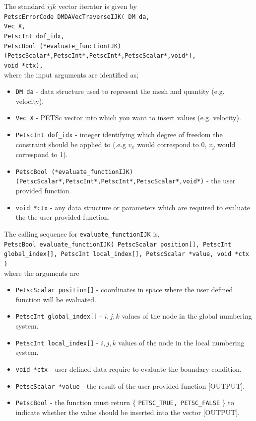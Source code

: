 \documentclass[paper=a4, fontsize=11pt,twoside]{scrartcl}
\newcommand{\shellcmd}[1]{\\\indent\indent\texttt{\hspace{5mm}\footnotesize #1}\\}
\newcommand{\unix}[1]{\texttt{\footnotesize #1}}
\begin{document}
{{The standard $ijk$ vector iterator is given by
\shellcmd{PetscErrorCode DMDAVecTraverseIJK( \newline
  DM da, \\
  Vec X, \\
  PetscInt dof\_idx, \\
  PetscBool (*evaluate\_functionIJK)(PetscScalar*,PetscInt*,PetscInt*,PetscScalar*,void*), \\
  void *ctx),} 
 where the input arguments are identified as;
\begin{itemize}
\item[] \unix{DM da} - data structure used to represent the mesh and quantity (e.g. velocity).
\item[] \unix{Vec X} - PETSc vector into which you want to insert values (e.g. velocity).
\item[] \unix{PetscInt dof\_idx} - integer identifying which degree of freedom the constraint should be applied to (.e.g $v_x$ would correspond to 0, $v_y$ would correspond to 1).
\item[] \unix{PetscBool (*evaluate\_functionIJK)(PetscScalar*,PetscInt*,PetscInt*,PetscScalar*,void*)} - the user provided function.
\item[] \unix{void *ctx} - any data structure or parameters which are required to evaluate the the user provided function.
\end{itemize}
The calling sequence for \unix{evaluate\_functionIJK} is,
\shellcmd{PetscBool evaluate\_functionIJK( PetscScalar position[], PetscInt global\_index[], PetscInt local\_index[], PetscScalar *value, void *ctx )}
where the arguments are
\begin{itemize}
\item[] \unix{PetscScalar position[]} - coordinates in space where the user defined function will be evaluated.
\item[] \unix{PetscInt global\_index[]} - $i,j,k$ values of the node in the global numbering system.
\item[] \unix{PetscInt local\_index[]} - $i,j,k$ values of the node in the local numbering system.
\item[] \unix{void *ctx} - user defined data require to evaluate the boundary condition.
\item[] \unix{PetscScalar *value} - the result of the user provided function [OUTPUT].
\item[] \unix{PetscBool} - the function must return \{ \unix{PETSC\_TRUE, PETSC\_FALSE} \} to indicate whether the value should be inserted into the vector [OUTPUT].
\end{itemize}




}}
\end{document}
